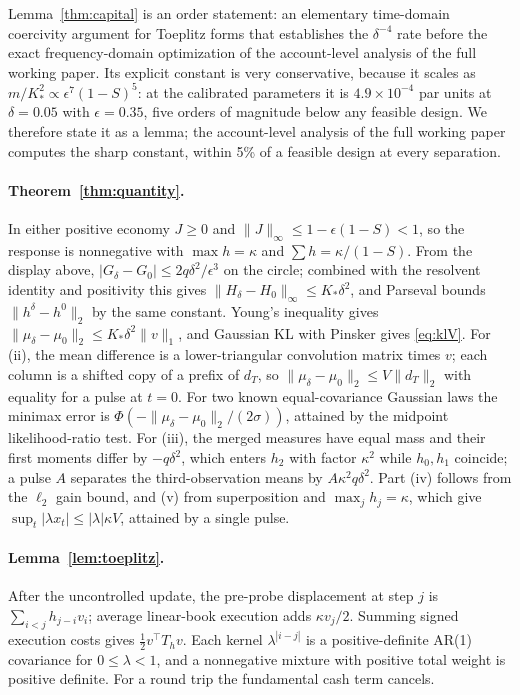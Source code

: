 \documentclass[12pt]{article}
\theoremstyle{definition}
\theoremstyle{remark}
\begin{document}
Lemma~\ref{thm:capital} is an order statement: an elementary time-domain coercivity argument for Toeplitz forms that establishes the $\delta^{-4}$ rate before the exact frequency-domain optimization of the account-level analysis of the full working paper. Its explicit constant is very conservative, because it scales as $m/K_*^2\propto\epsilon^7(1-S)^5$: at the calibrated parameters it is $4.9\times10^{-4}$ par units at $\delta=0.05$ with $\epsilon=0.35$, five orders of magnitude below any feasible design. We therefore state it as a lemma; the account-level analysis of the full working paper computes the sharp constant, within 5\% of a feasible design at every separation.

\paragraph{Theorem~\ref{thm:quantity}.} In either positive economy $J\ge0$ and $\|J\|_\infty\le1-\epsilon(1-S)<1$, so the response is nonnegative with $\max h=\kappa$ and $\sum h=\kappa/(1-S)$. From the display above, $|G_\delta-G_0|\le2q\delta^2/\epsilon^3$ on the circle; combined with the resolvent identity and positivity this gives $\|H_\delta-H_0\|_\infty\le K_*\delta^2$, and Parseval bounds $\|h^\delta-h^0\|_2$ by the same constant. Young's inequality gives $\|\mu_\delta-\mu_0\|_2\le K_*\delta^2\|v\|_1$, and Gaussian KL with Pinsker gives \eqref{eq:klV}. For (ii), the mean difference is a lower-triangular convolution matrix times $v$; each column is a shifted copy of a prefix of $d_T$, so $\|\mu_\delta-\mu_0\|_2\le V\|d_T\|_2$ with equality for a pulse at $t=0$. For two known equal-covariance Gaussian laws the minimax error is $\Phi(-\|\mu_\delta-\mu_0\|_2/(2\sigma))$, attained by the midpoint likelihood-ratio test. For (iii), the merged measures have equal mass and their first moments differ by $-q\delta^2$, which enters $h_2$ with factor $\kappa^2$ while $h_0,h_1$ coincide; a pulse $A$ separates the third-observation means by $A\kappa^2q\delta^2$. Part (iv) follows from the $\ell_2$ gain bound, and (v) from superposition and $\max_jh_j=\kappa$, which give $\sup_t|\lambda x_t|\le|\lambda|\kappa V$, attained by a single pulse.


\paragraph{Lemma~\ref{lem:toeplitz}.} After the uncontrolled update, the pre-probe displacement at step $j$ is $\sum_{i<j}h_{j-i}v_i$; average linear-book execution adds $\kappa v_j/2$. Summing signed execution costs gives $\tfrac12v^\top T_hv$. Each kernel $\lambda^{|i-j|}$ is a positive-definite AR(1) covariance for $0\le\lambda<1$, and a nonnegative mixture with positive total weight is positive definite. For a round trip the fundamental cash term cancels.
\end{document}
